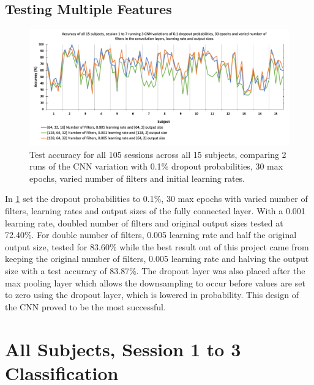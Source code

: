 \subsection{Testing Multiple Features}
\label{All Subjects, 1 to 7 Testing Multiple Features SubSection}

\begin{figure}[H]
\centering
\includegraphics[scale=0.5]{Media/SBJ1-15_S1-7/SBJ1-15&S1-7_Varied_No_Of_Filters_and_Learning_Rate_Accuracy.png}
\caption{Test accuracy for all 105 sessions across all 15 subjects, comparing 2 runs of the CNN variation with 0.1\% dropout probabilities, 30 max epochs, varied number of filters and initial learning rates.}
\label{S1-7 0.1dr varied filters 30 epochs varied lr}
\end{figure}

In \cref{S1-7 0.1dr varied filters 30 epochs varied lr} set the dropout probabilities to 0.1\%, 30 max epochs with varied number of filters, learning rates and output sizes of the fully connected layer. With a 0.001 learning rate, doubled number of filters and original output sizes tested at 72.40\%. For double number of filters, 0.005 learning rate and half the original output size, tested for 83.60\% while the best result out of this project came from keeping the original number of filters, 0.005 learning rate and halving the output size with a test accuracy of 83.87\%. The dropout layer was also placed after the max pooling layer which allows the downsampling to occur before values are set to zero using the dropout layer, which is lowered in probability. This design of the CNN proved to be the most successful.

\section{All Subjects, Session 1 to 3 Classification}
\label{All Subjects, Session 1 to 3 Classification Section}

